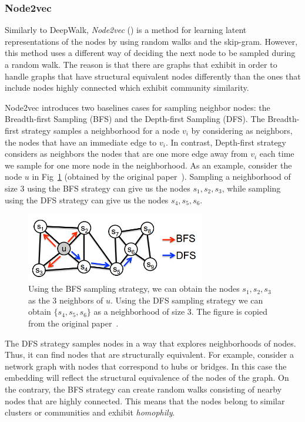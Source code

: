 \subsubsection{Node2vec}

Similarly to DeepWalk, \emph{Node2vec} (\cite{grover2016node2vec}) is a method
for learning latent representations of the nodes by using random walks and the
skip-gram. However, this method uses a different way of deciding the next node
to be sampled during a random walk. The reason is that there are graphs that
exhibit in order to handle graphs that have
structural equivalent nodes differently than the ones that include nodes
highly connected which exhibit community similarity.

Node2vec introduces two baselines cases for sampling neighbor nodes: the
Breadth-first Sampling (BFS) and the Depth-first Sampling (DFS).
The Breadth-first strategy samples a neighborhood for a node $v_i$ by
considering as neighbors, the nodes that have an immediate edge to $v_i$.
In contrast, Depth-first strategy considers as neighbors the nodes that are
one more edge away from $v_i$ each time we sample for one more node in the
neighborhood. As an example, consider the node $u$ in
Fig~\ref{sampling_strategies} (obtained by the original
paper~\cite{grover2016node2vec}). Sampling a neighborhood of size 3 using the
BFS strategy can give us the nodes $s_1, s_2, s_3$, while sampling using the DFS
strategy can give us the nodes $s_4, s_5, s_6$.
\begin{figure}
\begin{center}
\includegraphics[width=0.7\textwidth]{figures/sampling.png}
\end{center}
\caption{Using the BFS sampling strategy, we can obtain the nodes
$s_1, s_2, s_3$ as the 3 neighbors of $u$. Using the DFS sampling strategy we
can obtain $\{s_4, s_5, s_6\}$ as a neighborhood of size 3. The figure is copied
from the original paper~\cite{grover2016node2vec}.}
\label{sampling_strategies}
\end{figure}
The DFS strategy samples nodes in a way that explores neighborhoods of nodes. 
Thus, it can find nodes that are structurally equivalent. For example, consider 
a network graph with nodes that correspond to hubs or bridges. In this case the 
embedding will reflect the structural equivalence of the nodes of the graph.
On the contrary, the BFS strategy can create random walks consisting of nearby 
nodes that are highly connected. This means that the nodes belong to similar 
clusters or communities and exhibit \emph{homophily}.

